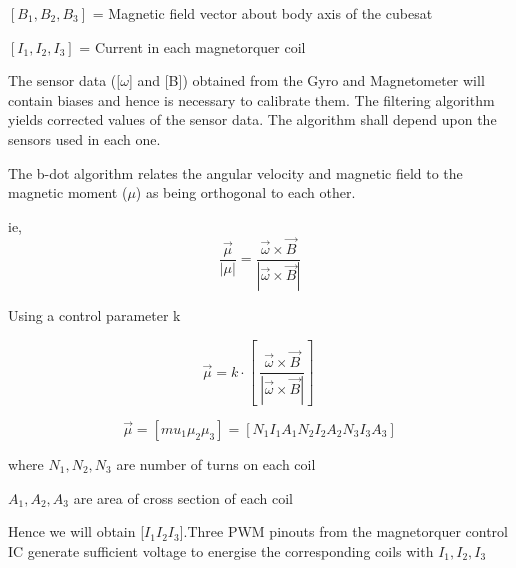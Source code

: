 \hspace{25pt}$[B_1,B_2,B_3]$ = Magnetic field vector about body axis of the cubesat

\hspace{25pt}$[I_1,I_2,I_3]$ = Current in each magnetorquer coil

\vspace{15pt}

The sensor data ([$\omega$] and [B]) obtained from the Gyro and Magnetometer will contain biases and hence is necessary to calibrate them. The filtering algorithm yields corrected values of the sensor data. The algorithm shall depend upon the sensors used in each one. 

\vspace{15pt}

The b-dot algorithm relates the angular velocity and magnetic field to the magnetic moment ($\mu$) as being orthogonal to each other.

ie,$$\frac{\vec{\mu}}{|\mu|} = \frac{\vec{\omega}\times\vec{B}}{|\vec{\omega}\times\vec{B}|}$$

\vspace{1cm}
\hspace{45pt}Using a control parameter k
\vspace{1cm}

$$\vec{\mu} = k\cdot [\ \frac{\vec{\omega}\times\vec{B}}{|\vec{\omega}\times\vec{B}|} ]\ $$

$$\vec{\mu}= [mu_1 \mu_2 \mu_3] = [N_1I_1A_1  N_2I_2A_2  N_3I_3A_3]$$

where $N_1,N_2,N_3$ are number of turns on each coil

\hspace{32pt}$A_1,A_2,A_3$ are area of cross section of each coil

\vspace{15pt}
Hence we will obtain [$I_1 I_2 I_3$].Three PWM pinouts from the magnetorquer control IC generate sufficient voltage to energise the corresponding coils with $I_1 ,I_2, I_3$
